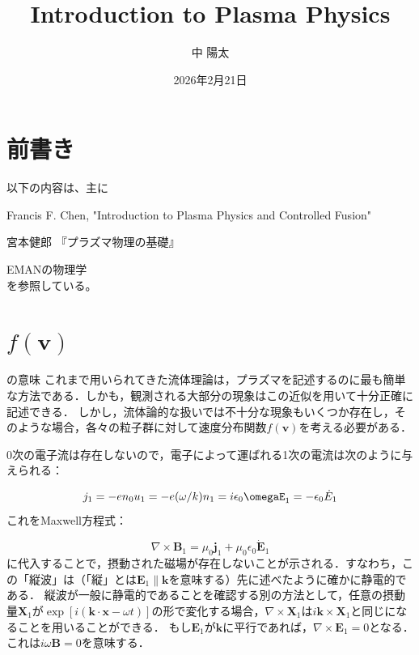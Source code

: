 \documentclass{ltjsarticle}
\title{Introduction to Plasma Physics}
\author{中 陽太}
\date{2026年2月21日}
\numberwithin{equation}{section} %
\begin{document}
\maketitle

\tableofcontents

\section*{前書き}
 以下の内容は、主に

\cite{a} Francis F. Chen, "Introduction to Plasma Physics and Controlled Fusion"\par
\cite{b} 宮本健郎 『プラズマ物理の基礎』\par
\cite{c} EMANの物理学\\
を参照している。

\section{\texorpdfstring{$f(\bm{v})$}{f(v)}}の意味 \label{section7}
これまで用いられてきた流体理論は，プラズマを記述するのに最も簡単な方法である．しかも，観測される大部分の現象はこの近似を用いて十分正確に記述できる．
しかし，流体論的な扱いでは不十分な現象もいくつか存在し，そのような場合，各々の粒子群に対して速度分布関数$f(\bm{v})$を考える必要がある．





0次の電子流は存在しないので，電子によって運ばれる1次の電流は次のように与えられる：

\begin{equation}
  j_1 = -en_0u_1 = -e(\omega/k)n_1 = i\epsilon_0\omegaE_1 = -\epsilon_0\dot{E}_1 \label{16.9}
\end{equation}
これをMaxwell方程式：

\begin{equation}
  \nabla \times \bm{B}_1 = \mu_0\bm{j}_1 + \mu_0\epsilon_0\dot{\bm{E}}_1 \label{16.10}
\end{equation}
に代入することで，摂動された磁場が存在しないことが示される．すなわち，この「縦波」は（「縦」とは$\bm{E}_1 \parallel \bm{k}$を意味する）先に述べたように確かに静電的である．
縦波が一般に静電的であることを確認する別の方法として，任意の摂動量$\bm{X}_1$が$\exp[i(\bm{k}\cdot \bm{x} -\omega t)]$の形で変化する場合，$\nabla \times \bm{X}_1$は$i\bm{k}\times \bm{X}_1$と同じになることを用いることができる．
もし$\bm{E}_1$が$\bm{k}$に平行であれば，$\nabla \times \bm{E}_1 = 0$となる．これは$i\omega\bm{B}=0$を意味する．
\end{document}
